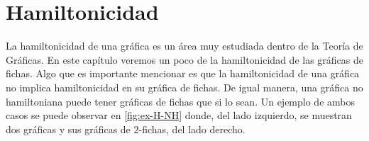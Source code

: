 \chapter{Hamiltonicidad}%
\label{cap:hamilt}

La hamiltonicidad de una gr\'afica es un \'area muy estudiada dentro de la
Teor\'ia de Gr\'aficas. En este cap\'itulo veremos un poco de la hamiltonicidad
de las gr\'aficas de fichas. Algo que es importante mencionar es que la
hamiltonicidad de una gr\'afica no implica hamiltonicidad en su gr\'afica de
fichas. De igual manera, una gr\'afica no hamiltoniana puede tener gr\'aficas de
fichas que si lo sean. Un ejemplo de ambos casos se puede observar en
\cref{fig:ex-H-NH} donde, del lado izquierdo, se muestran dos gr\'aficas y sus
gr\'aficas de $2$-fichas, del lado derecho.


